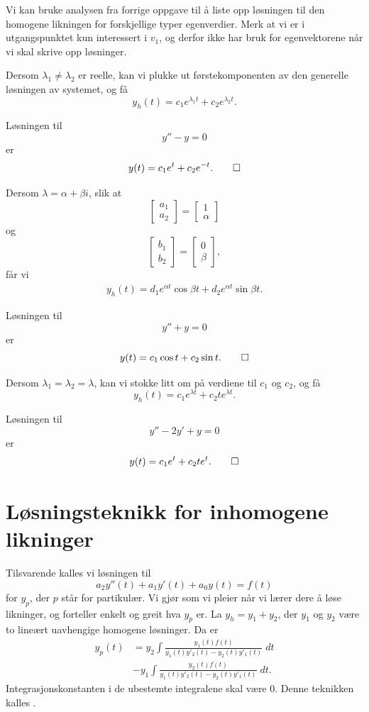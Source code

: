 Vi kan bruke analysen fra forrige oppgave til å liste opp løsningen til den homogene likningen for forskjellige typer egenverdier. 
Merk at vi er i utgangspunktet kun interessert i $v_1$, og derfor ikke har bruk for egenvektorene når vi skal skrive opp løsninger.

Dersom $\lambda_1 \neq \lambda_2$ er reelle, kan vi plukke ut førstekomponenten av den generelle løsningen av systemet, og få
\[
y_h(t)=c_1e^{\lambda_1 t}+c_2e^{\lambda_2 t}.
\]
\begin{ex}
Løsningen til 
\[
y''-y=0
\]
er
\[
y(t)=c_1e^t+c_2e^{-t}. \qedhere
\]
\end{ex}

\noindent Dersom $\lambda=\alpha + \beta i$, slik at 
\[
\begin{bmatrix}
a_1 \\ a_2
\end{bmatrix}
=
\begin{bmatrix}
1 \\ \alpha
\end{bmatrix}
\]
og
\[
\begin{bmatrix}
b_1 \\ b_2
\end{bmatrix}
=
\begin{bmatrix}
0 \\ \beta
\end{bmatrix},
\]
får vi 
\begin{align*}
y_h(t)=d_1e^{\alpha t}\cos\beta t+d_2e^{\alpha t}\sin\beta t.
\end{align*}
\begin{ex}
Løsningen til 
\[
y''+y=0
\]
er
\[
y(t)=c_1\cos t+c_2\sin t. \qedhere
\]
\end{ex}

\noindent Dersom $\lambda_1=\lambda_2=\lambda$, kan vi stokke litt om på verdiene til $c_1$ og $c_2$, og få
\[
y_h(t)=c_1e^{\lambda t}+c_2te^{\lambda t}.
\]
\begin{ex}
Løsningen til 
\[
y''-2y'+y=0
\]
er
\[
y(t)=c_1e^t+c_2te^t. \qedhere
\]
\end{ex}


\section*{Løsningsteknikk for inhomogene likninger}
Tilsvarende kalles vi løsningen til
\[
a_2y''(t)+a_1y'(t)+a_0y(t)=f(t)
\]
for $y_p$, der $p$ står for partikulær. Vi gjør som vi pleier når vi lærer dere å løse likninger, og forteller enkelt og greit hva $y_p$ er. 
La $y_h=y_1+y_2$, der $y_1$ og $y_2$ være to lineært uavhengige homogene løsninger. 
Da er
\begin{align*}
y_p(t)&=y_2\int \frac{y_1(t)f(t)}{y_1(t)y'_2(t)-y_2(t)y'_1(t)}\; dt \\ &-y_1\int \frac{y_2(t)f(t)}{y_1(t)y'_2(t)-y_2(t)y'_1(t)}\; dt.
\end{align*}
Integrasjonskonstanten i de ubestemte integralene skal være 0. 
Denne teknikken kalles .


